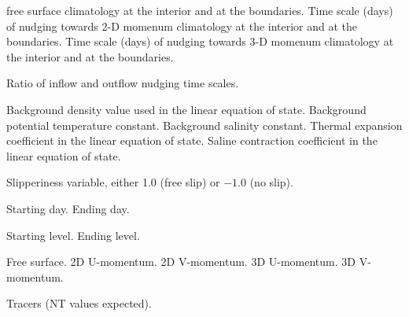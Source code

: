 \begin{klist}
\begin{klist}
     free surface climatology at the interior and at the boundaries.
           Time scale (days) of nudging towards
     2-D momenum climatology at the interior and at the boundaries.
           Time scale (days) of nudging towards
     3-D momenum climatology at the interior and at the boundaries.
     \end{klist}
     \begin{klist}
          Ratio of inflow and outflow nudging time scales.
     \end{klist}
     \begin{klist}
              Background density value used in
    the linear equation of state.
              Background potential temperature constant.
              Background salinity constant.
           Thermal expansion coefficient in the linear
    equation of state.
           Saline contraction coefficient in the linear
    equation of state.
     \end{klist}
     \begin{klist}
          Slipperiness variable, either 1.0 (free
     slip) or $-1.0$ (no slip).
     \end{klist}
     \begin{klist}
        Starting day.
        Ending day.
     \end{klist}
     \begin{klist}
        Starting level.
        Ending level.
     \end{klist}
     \begin{klist}
        Free surface.
        2D U-momentum.
        2D V-momentum.
        3D U-momentum.
        3D V-momentum.
     \end{klist}
     \begin{klist}
        Tracers (NT values expected).
     \end{klist}
     \begin{klist}

\end{klist}
\end{klist}

